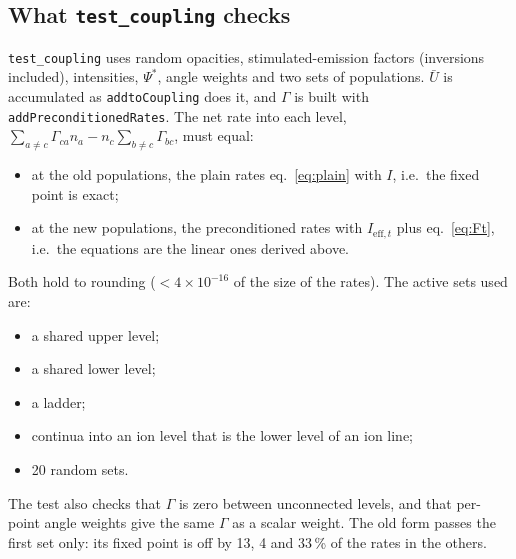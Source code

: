 \documentclass[11pt,a4paper]{article}
\newcommand{\code}[1]{\texttt{#1}}
\begin{document}
\subsection{What \code{test\_coupling} checks}
\code{test\_coupling} uses random opacities, stimulated-emission factors
(inversions included), intensities, $\Psi^*$, angle weights and two sets
of populations. $\bar U$ is accumulated as \code{addtoCoupling} does it,
and $\Gamma$ is built with \code{addPreconditionedRates}. The net rate
into each level, $\sum_{a\ne c}\Gamma_{ca}n_a - n_c\sum_{b\ne c}\Gamma_{bc}$,
must equal:
\begin{itemize}
\item at the old populations, the plain rates eq.~\eqref{eq:plain} with $I$,
  i.e.\ the fixed point is exact;
\item at the new populations, the preconditioned rates with
  $I_{\text{eff},t}$ plus eq.~\eqref{eq:Ft}, i.e.\ the equations are
  the linear ones derived above.
\end{itemize}
Both hold to rounding ($<4\times10^{-16}$ of the size of the rates). The
active sets used are:
\begin{itemize}
\item a shared upper level;
\item a shared lower level;
\item a ladder;
\item continua into an ion level that is the lower level of an ion line;
\item 20 random sets.
\end{itemize}
The test also checks that $\Gamma$ is zero between unconnected levels,
and that per-point angle weights give the same $\Gamma$ as a scalar
weight. The old form passes the first set only: its fixed point is off
by 13, 4 and 33\,\% of the rates in the others.
\end{document}
